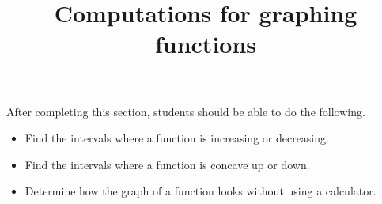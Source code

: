 \documentclass{ximera}
\title{Computations for graphing functions}
\begin{document}
\begin{abstract}
\end{abstract}

\maketitle

\begin{sectionOutcomes}

After completing this section, students should be able to do the following.

\begin{itemize}
\item Find the intervals where a function is increasing or decreasing.
\item Find the intervals where a function is concave up or down.
\item Determine how the graph of a function looks without using a calculator.
\end{itemize}

\end{sectionOutcomes}
\end{document}
